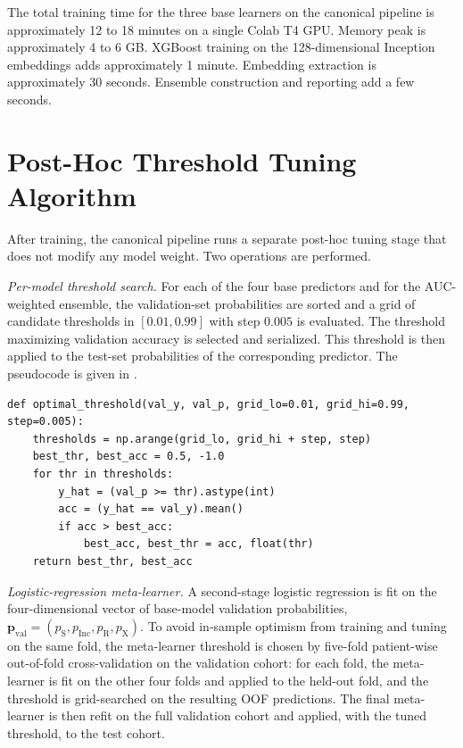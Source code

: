 The total training time for the three base learners on the canonical pipeline is approximately 12 to 18 minutes on a single Colab T4 GPU. Memory peak is approximately 4 to 6 GB. XGBoost training on the 128-dimensional Inception embeddings adds approximately 1 minute. Embedding extraction is approximately 30 seconds. Ensemble construction and reporting add a few seconds.

\section{Post-Hoc Threshold Tuning Algorithm}
\label{sec:threshold-tuning}

After training, the canonical pipeline runs a separate post-hoc tuning stage that does not modify any model weight. Two operations are performed.

\textit{Per-model threshold search.} For each of the four base predictors and for the AUC-weighted ensemble, the validation-set probabilities are sorted and a grid of candidate thresholds in $[0.01, 0.99]$ with step $0.005$ is evaluated. The threshold maximizing validation accuracy is selected and serialized. This threshold is then applied to the test-set probabilities of the corresponding predictor. The pseudocode is given in .

\begin{lstlisting}[caption={Accuracy-optimal threshold tuning on validation (\texttt{tune.py}).}, label={lst:thr-tune}]
def optimal_threshold(val_y, val_p, grid_lo=0.01, grid_hi=0.99, step=0.005):
    thresholds = np.arange(grid_lo, grid_hi + step, step)
    best_thr, best_acc = 0.5, -1.0
    for thr in thresholds:
        y_hat = (val_p >= thr).astype(int)
        acc = (y_hat == val_y).mean()
        if acc > best_acc:
            best_acc, best_thr = acc, float(thr)
    return best_thr, best_acc
\end{lstlisting}

\textit{Logistic-regression meta-learner.} A second-stage logistic regression is fit on the four-dimensional vector of base-model validation probabilities, $\mathbf{p}_{\mathrm{val}} = (p_{\mathrm{S}}, p_{\mathrm{Inc}}, p_{\mathrm{R}}, p_{\mathrm{X}})$. To avoid in-sample optimism from training and tuning on the same fold, the meta-learner threshold is chosen by five-fold patient-wise out-of-fold cross-validation on the validation cohort: for each fold, the meta-learner is fit on the other four folds and applied to the held-out fold, and the threshold is grid-searched on the resulting OOF predictions. The final meta-learner is then refit on the full validation cohort and applied, with the tuned threshold, to the test cohort.


